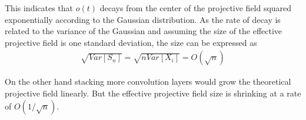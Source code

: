 This indicates that $o(t)$ decays from the center of the projective field squared exponentially according to the Gaussian distribution.
As the rate of decay is related to the variance of the Gaussian and assuming the size of the effective projective field is one standard deviation, the size can be expressed as
\begin{align}
	\sqrt{Var[S_n]} = \sqrt{nVar[X_i]} = O(\sqrt{n})
\end{align}

On the other hand stacking more convolution layers would grow the theoretical projective field linearly. But the effective projective field size is shrinking at a rate of $O(1/\sqrt{n})$.
